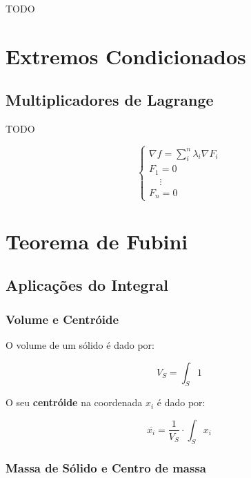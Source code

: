 \documentclass[11pt, a4paper]{article}
\begin{document}
TODO 

\section{Extremos Condicionados}

\subsection{Multiplicadores de Lagrange}

TODO

\begin{equation*}
    \begin{cases}
        \nabla f = \sum_{i}^{n} \lambda_i \nabla F_i \\
        F_1 = 0                                      \\
        \ \ \ \ \ \vdots                             \\
        F_n = 0
    \end{cases}
\end{equation*}

\section{Teorema de Fubini}

\subsection{Aplicações do Integral}

\subsubsection{Volume e Centróide}

O volume de um sólido é dado por:

\begin{equation*}
    V_S = \int_{S} 1
\end{equation*}

O seu \textbf{centróide} na coordenada $x_i$ é dado por:

\begin{equation*}
    \overline{x_i} = \frac{1}{V_S} \cdot \int_{S} x_i
\end{equation*}

\subsubsection{Massa de Sólido e Centro de massa}
\end{document}
